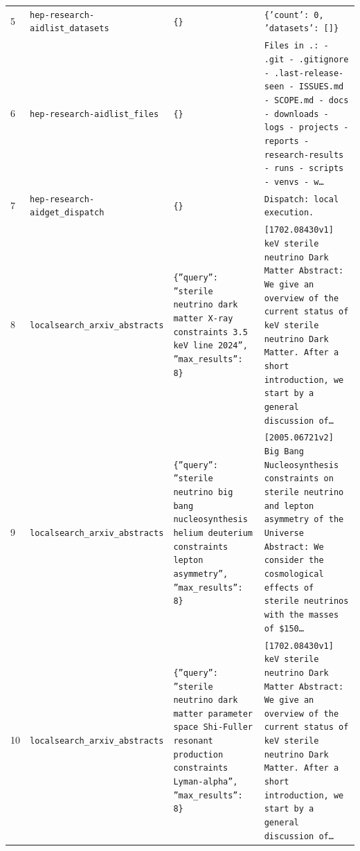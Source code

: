\documentclass[11pt,a4paper]{article}
\begin{document}
\begin{longtable}{@{}p{}p{}p{}p{}@{}}
5 & \texttt{hep-research-aid}\newline\texttt{list\_\allowbreak{}datasets} & \texttt{\{\}\allowbreak{}} & \texttt{\{'count':\allowbreak{} 0,\allowbreak{} 'datasets':\allowbreak{} []\allowbreak{}\}\allowbreak{}} \\
6 & \texttt{hep-research-aid}\newline\texttt{list\_\allowbreak{}files} & \texttt{\{\}\allowbreak{}} & \texttt{Files in .:\allowbreak{}   - .git   - .gitignore   - .last-release-seen   - ISSUES.md   - SCOPE.md   - docs   - downloads   - logs   - projects   - reports   - research-results   - runs   - scripts   - venvs   - w\ldots{}\allowbreak{}} \\
7 & \texttt{hep-research-aid}\newline\texttt{get\_\allowbreak{}dispatch} & \texttt{\{\}\allowbreak{}} & \texttt{Dispatch:\allowbreak{} local execution.} \\
8 & \texttt{local}\newline\texttt{search\_\allowbreak{}arxiv\_\allowbreak{}abstracts} & \texttt{\{''query'':\allowbreak{} ''sterile neutrino dark matter X-ray constraints 3.5 keV line 2024'',\allowbreak{} ''max\_\allowbreak{}results'':\allowbreak{} 8\}\allowbreak{}} & \texttt{[1702.08430v1]\allowbreak{} keV sterile neutrino Dark Matter Abstract:\allowbreak{} We give an overview of the current status of keV sterile neutrino Dark Matter. After a short introduction,\allowbreak{} we start by a general discussion of\ldots{}\allowbreak{}} \\
9 & \texttt{local}\newline\texttt{search\_\allowbreak{}arxiv\_\allowbreak{}abstracts} & \texttt{\{''query'':\allowbreak{} ''sterile neutrino big bang nucleosynthesis helium deuterium constraints lepton asymmetry'',\allowbreak{} ''max\_\allowbreak{}results'':\allowbreak{} 8\}\allowbreak{}} & \texttt{[2005.06721v2]\allowbreak{} Big Bang Nucleosynthesis constraints on sterile neutrino and lepton asymmetry of the Universe Abstract:\allowbreak{} We consider the cosmological effects of sterile neutrinos with the masses of \$150\ldots{}\allowbreak{}} \\
10 & \texttt{local}\newline\texttt{search\_\allowbreak{}arxiv\_\allowbreak{}abstracts} & \texttt{\{''query'':\allowbreak{} ''sterile neutrino dark matter parameter space Shi-Fuller resonant production constraints Lyman-alpha'',\allowbreak{} ''max\_\allowbreak{}results'':\allowbreak{} 8\}\allowbreak{}} & \texttt{[1702.08430v1]\allowbreak{} keV sterile neutrino Dark Matter Abstract:\allowbreak{} We give an overview of the current status of keV sterile neutrino Dark Matter. After a short introduction,\allowbreak{} we start by a general discussion of\ldots{}\allowbreak{}} \\

\end{longtable}
\end{document}

